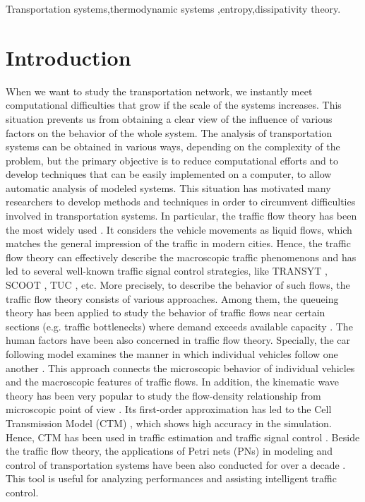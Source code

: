 \documentclass[preprint,authoryear,12pt]{elsarticle}
\begin{document}
\begin{frontmatter}
\begin{keyword}
Transportation systems\sep thermodynamic systems \sep entropy\sep dissipativity theory.
\end{keyword}

\end{frontmatter}

\section{Introduction}

When we want to study the transportation network, we instantly meet computational difficulties that grow if the scale of the systems increases. This situation prevents us from obtaining a clear view of the influence of various factors on the behavior of the whole system. The analysis of transportation systems can be obtained in various ways, depending on the complexity of the problem, but the primary objective is to reduce computational efforts and to develop techniques that can be easily implemented on a computer, to allow automatic analysis of modeled systems. This situation has motivated many researchers to develop methods and techniques in order to circumvent difficulties involved in transportation systems.
In particular, the traffic flow theory has been the most widely used \citep{nathan_h_gartner_revised_2005}. It considers the vehicle movements as liquid flows, which matches the general impression of the traffic in modern cities. Hence, the traffic flow theory can effectively describe the macroscopic traffic phenomenons and has led to several well-known traffic signal control strategies, like TRANSYT \citep{hale_traffic_2005}, SCOOT \citep{bretherton_r_d_scoot_1982}, TUC \citep{diakaki_multivariable_2002,papageorgiou_review_2003}, etc.
More precisely, to describe the behavior of such flows, the traffic flow theory consists of various approaches. Among them, the queueing theory has been applied to study the behavior of traffic flows near certain sections (e.g. traffic bottlenecks) where demand exceeds available capacity \citep{Vandaele2000}.
The human factors have been also concerned in traffic flow theory. Specially, the car following model examines the manner in which individual vehicles follow one another \citep{Gipps1981,Zhao2005}. This approach connects the microscopic behavior of individual vehicles and the macroscopic features of traffic flows.
In addition, the kinematic wave theory has been very popular to study the flow-density relationship from microscopic point of view \citep{zhang_kinematic_2002,jin_multicommodity_2004}. Its first-order approximation has led to the Cell Transmission Model (CTM) \citep{daganzo_cell_1995}, which shows high accuracy in the simulation. Hence, CTM has been used in traffic estimation \citep{CanudasdeWit2012} and traffic signal control \citep{Pohlmann2010}.
Beside the traffic flow theory, the applications of Petri nets (PNs) in modeling and control of transportation systems have been also conducted for over a decade \citep{ng_review_2013}. This tool is useful for analyzing performances and assisting intelligent traffic control.
\end{document}
